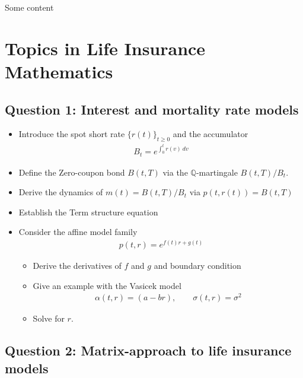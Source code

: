 \documentclass[a4paper,12pt,openany]{book}
\providecommand{\tightlist}{%
 \setlength{\itemsep}{0pt}\setlength{\parskip}{0pt}}
\begin{document}
Some content

\hypertarget{topics-in-life-insurance-mathematics}{%
\chapter{Topics in Life Insurance Mathematics}\label{topics-in-life-insurance-mathematics}}

\hypertarget{question-1-interest-and-mortality-rate-models}{%
\section{Question 1: Interest and mortality rate models}\label{question-1-interest-and-mortality-rate-models}}

\begin{itemize}
\tightlist
\item
  Introduce the spot short rate \(\{r(t)\}_{t\ge 0}\) and the accumulator
  \begin{align*}
    B_t=e^{\int_0^tr(v)\ dv}
    \end{align*}
\item
  Define the Zero-coupon bond \(B(t,T)\) via the \(\mathbb Q\)-martingale \(B(t,T)/B_t\).
\item
  Derive the dynamics of \(m(t)=B(t,T)/B_t\) via \(p(t,r(t))=B(t,T)\)
\item
  Establish the Term structure equation
\item
  Consider the affine model family
  \begin{align*}
    p(t,r)=e^{f(t)r+g(t)}
    \end{align*}

  \begin{itemize}
  \tightlist
  \item
    Derive the derivatives of \(f\) and \(g\) and boundary condition
  \item
    Give an example with the Vasicek model
    \begin{align*}
    \alpha(t,r)=(a-br),\qquad \sigma(t,r)=\sigma^2
    \end{align*}
  \item
    Solve for \(r\).
  \end{itemize}
\end{itemize}

\newpage

\hypertarget{question-2-matrix-approach-to-life-insurance-models}{%
\section{Question 2: Matrix-approach to life insurance models}\label{question-2-matrix-approach-to-life-insurance-models}}
\end{document}
